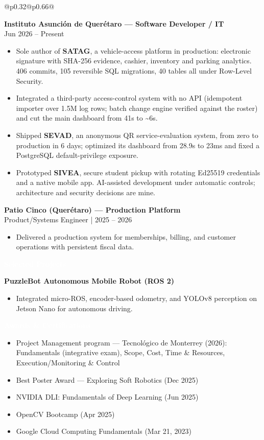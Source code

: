 \documentclass[10pt,letterpaper]{article}
\newcommand{\smalltext}[1]{\small #1}
\newcommand{\sectionbar}[1]{\colorbox{accent}{\parbox{\dimexpr\linewidth-2\fboxsep}{\textcolor{white}{\bfseries #1}}}}
\begin{document}
\begin{tabularx}{\textwidth}{@{}p{0.32\textwidth}@{\hspace{0.02\textwidth}}p{0.66\textwidth}@{}}
\begin{minipage}[t]{\linewidth}
\textbf{Instituto Asunción de Querétaro — Software Developer / IT}\\
\smalltext{Jun 2026 -- Present}
\begin{itemize}[leftmargin=*]
  \item Sole author of \textbf{SATAG}, a vehicle-access platform in production: electronic signature with SHA-256 evidence, cashier, inventory and parking analytics. 406 commits, 105 reversible SQL migrations, 40 tables all under Row-Level Security.
  \item Integrated a third-party access-control system with no API (idempotent importer over 1.5M log rows; batch change engine verified against the roster) and cut the main dashboard from 41s to \textasciitilde6s.
  \item Shipped \textbf{SEVAD}, an anonymous QR service-evaluation system, from zero to production in 6 days; optimized its dashboard from 28.9s to 23ms and fixed a PostgreSQL default-privilege exposure.
  \item Prototyped \textbf{SIVEA}, secure student pickup with rotating Ed25519 credentials and a native mobile app. AI-assisted development under automatic controls; architecture and security decisions are mine.
\end{itemize}

\textbf{Patio Cinco (Querétaro) — Production Platform}\\
\smalltext{Product/Systems Engineer | 2025 -- 2026}
\begin{itemize}[leftmargin=*]
  \item Delivered a production system for memberships, billing, and customer operations with persistent fiscal data.
\end{itemize}

\sectionbar{Selected Projects}
\textbf{PuzzleBot Autonomous Mobile Robot (ROS 2)}
\begin{itemize}[leftmargin=*]
  \item Integrated micro-ROS, encoder-based odometry, and YOLOv8 perception on Jetson Nano for autonomous driving.
\end{itemize}

\sectionbar{Awards \& Certifications}
\begin{itemize}[leftmargin=*]
  \item Project Management program — Tecnológico de Monterrey (2026): Fundamentals (integrative exam), Scope, Cost, Time \& Resources, Execution/Monitoring \& Control
  \item Best Poster Award — Exploring Soft Robotics (Dec 2025)
  \item NVIDIA DLI: Fundamentals of Deep Learning (Jun 2025)
  \item OpenCV Bootcamp (Apr 2025)
  \item Google Cloud Computing Fundamentals (Mar 21, 2023)
\end{itemize}


\end{minipage}
\end{tabularx}
\end{document}
